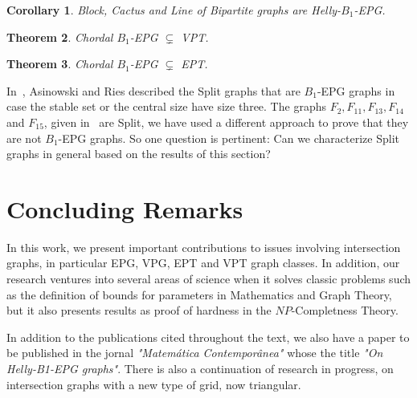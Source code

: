 \documentclass[12pt]{article}
\newtheorem{theorem}{Theorem}
\newtheorem{cor}[theorem]{Corollary}
\begin{document}
\begin{cor}\label{lem:cdf}
 Block, Cactus and Line of Bipartite graphs are Helly-$B_1$-EPG.
\end{cor}


 
 \begin{theorem}\label{teo:chordalB1inVPT}
Chordal $B_1$-EPG $\subsetneq$ VPT. 
\end{theorem}

\begin{theorem}\label{teo:b1epgept}
Chordal $B_1$-EPG $\subsetneq$ EPT. 
\end{theorem}



  
 
 In~\cite{ries2009}, Asinowski and Ries described the   Split graphs that are $B_1$-EPG graphs in case the stable set  or the  central  size have size three. 
The graphs $F_2, F_{11}, F_{13}, F_{14}$ and $F_{15}$, given in~\cite{leveque2009characterizing} are Split, we have  used a different approach  to prove that they are not $B_1$-EPG graphs. So one question is pertinent: Can we characterize Split graphs in general based on the results of this section? 

\section{Concluding Remarks}
In this work, we present important contributions to issues involving intersection graphs, in particular EPG, VPG, EPT and VPT graph classes. In addition, our research ventures into several areas of science when it solves classic problems such as the definition of bounds for parameters in Mathematics and Graph Theory, but it also presents results as proof of hardness in the  $NP$-Completness Theory.

In addition to the publications cited throughout the text, we also have a paper to be published in the jornal \textit{"Matemática Contemporânea"} whose the title \textit{"On Helly-B1-EPG graphs"}. There is also a continuation of research in progress, on intersection graphs with a new type of grid, now triangular.



\end{document}
